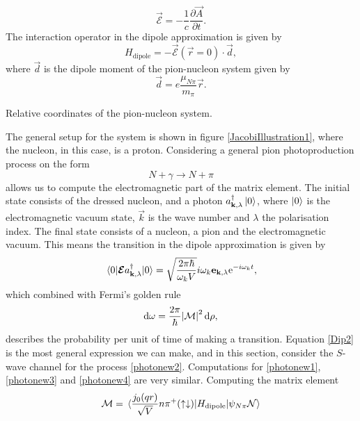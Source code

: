 \begin{equation}\label{EF}
	\vec{\mathcal{E}} = -\frac{1}{c} \frac{\partial \vec{A}}{\partial t}.
\end{equation}
The interaction operator in the dipole approximation is given by
\begin{equation}\label{Dip}
	H_\text{dipole} = -\vec{\mathcal{E}}(\vec{r}=0)\cdot \vec{d},
\end{equation}
where $\vec{d}$ is the dipole moment of the pion-nucleon system given by 
\begin{equation}\label{dipolemoment}
	\vec{d}=e\frac{\mu_{N\pi}}{m_\pi}\vec{r}.
\end{equation}
\begin{marginfigure}
	\centering
	
	\caption{Relative coordinates of the pion-nucleon system.}
	\label{JacobiIllustration1}
\end{marginfigure}
The general setup for the system is shown in figure \ref{JacobiIllustration1}, where the nucleon, in this case, is a proton. Considering a general pion photoproduction process on the form
\begin{equation}\label{General}
	N+\gamma \rightarrow N+\pi
\end{equation}
allows us to compute the electromagnetic part of the matrix element. The initial state consists of the dressed nucleon, and a photon $a_{\bm{\mathrm{k}},\lambda}^\dagger \ket{0}$, where $\ket{0}$ is the electromagnetic vacuum state, $\vec{k}$ is the wave number and $\lambda$ the polarisation index. The final state consists of a nucleon, a pion and the electromagnetic vacuum. This means the transition in the dipole approximation is given by 
\begin{equation}\label{Dip2}
	\mel{0}{\bm{\mathrm{\mathcal{E}}}a_{\bm{\mathrm{k}},\lambda}^\dagger}{0} = \sqrt{\frac{2\pi\hbar}{\omega_k V}}i\omega_k \bm{\mathrm{e}}_{\bm{\mathrm{k}},\lambda}\text{e}^{-i\omega_k t},
\end{equation}
which combined with Fermi's golden rule
\begin{equation}\label{FermiGoldenRule}
	\text{d}\omega = \frac{2\pi}{\hbar}\abs{\mathcal{M}}^2 \text{d}\rho,
\end{equation}
describes the probability per unit of time of making a transition. Equation \eqref{Dip2} is the most general expression we can make, and in this section, consider the $S$-wave channel for the process \eqref{photonew2}. Computations for \eqref{photonew1}, \eqref{photonew3} and \eqref{photonew4} are very similar. Computing the matrix element
\begin{equation}\label{Hdip}
	\mathcal{M}=\mel*{\frac{j_0(qr)}{\sqrt{V}}n\pi^+(\uparrow\downarrow)}{H_\text{dipole}}{\psi_{N\pi}\mathcal{N}}
\end{equation}
